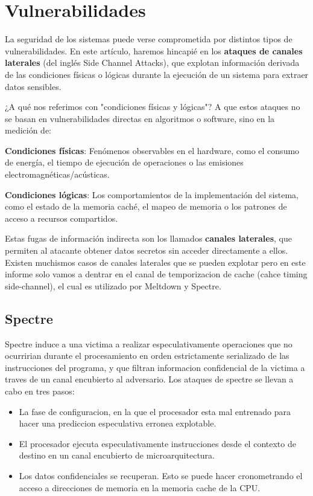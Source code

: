 \documentclass[lettersize,compsoc]{IEEEtran}
\begin{document}
\section{Vulnerabilidades}
La seguridad de los sistemas puede verse comprometida por distintos tipos de vulnerabilidades. En este artículo, haremos hincapié en los \textbf{ataques de canales laterales} (del inglés Side Channel Attacks), que explotan información derivada de las condiciones físicas o lógicas durante la ejecución de un sistema para extraer datos sensibles.

¿A qué nos referimos con "condiciones físicas y lógicas"? A que estos ataques no se basan en vulnerabilidades directas en algoritmos o software, sino en la medición de:

    \textbf{Condiciones físicas}: Fenómenos observables en el hardware, como el consumo de energía, el tiempo de ejecución de operaciones o las emisiones electromagnéticas/acústicas.

    \textbf{Condiciones lógicas}: Los comportamientos de la implementación del sistema, como el estado de la memoria caché, el mapeo de memoria o los patrones de acceso a recursos compartidos.

Estas fugas de información indirecta son los llamados \textbf{canales laterales}, que permiten al atacante obtener datos secretos sin acceder directamente a ellos. \newline
Existen muchismos casos de canales laterales que se pueden explotar pero en este informe solo vamos a dentrar en el canal de temporizacion de cache (cahce timing side-channel), el cual es utilizado por Meltdown y Spectre.
\subsection{Spectre}
Spectre induce a una victima a realizar especulativamente operaciones que no ocurririan durante el procesamiento en orden estrictamente serializado de las instrucciones del programa, y que filtran informacion confidencial de la victima a traves de un canal encubierto al adversario.
Los ataques  de spectre se llevan a cabo en tres pasos:
\begin{itemize}
  \item La fase de configuracion, en la que el procesador esta mal entrenado para hacer una prediccion especulativa erronea explotable.
  \item El procesador ejecuta especulativamente instrucciones desde el contexto de destino en un canal encubierto de microarquitectura.
  \item Los datos confidenciales se recuperan. Esto se puede hacer cronometrando el acceso a direcciones de memoria en la memoria cache de la CPU.
\end{itemize}
\noindent 
\end{document}
